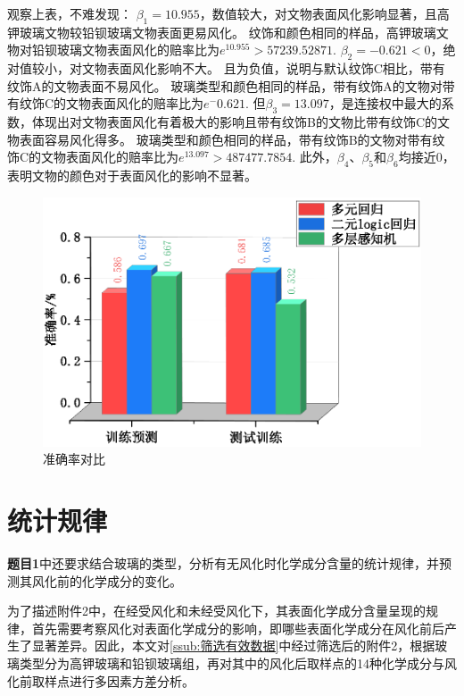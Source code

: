 观察上表，不难发现：
$\beta_1=10.955$，数值较大，对文物表面风化影响显著，且高钾玻璃文物较铅钡玻璃文物表面更易风化。
纹饰和颜色相同的样品，高钾玻璃文物对铅钡玻璃文物表面风化的赔率比为$e^10.955>57239.52871$.
$\beta_2=-0.621<0$，绝对值较小，对文物表面风化影响不大。
且为负值，说明与默认纹饰C相比，带有纹饰A的文物表面不易风化。
玻璃类型和颜色相同的样品，带有纹饰A的文物对带有纹饰C的文物表面风化的赔率比为$e^-0.621$.
但$\beta_3=13.097$，是连接权中最大的系数，体现出对文物表面风化有着极大的影响且带有纹饰B的文物比带有纹饰C的文物表面容易风化得多。
玻璃类型和颜色相同的样品，带有纹饰B的文物对带有纹饰C的文物表面风化的赔率比为$e^13.097>487477.7854$.
此外，$\beta_4$、$\beta_5$和$\beta_6$均接近0，表明文物的颜色对于表面风化的影响不显著。


\begin{figure}[!htp]
	\centering
	\includegraphics[width=12cm]{figure/准确率.eps}
	\caption{准确率对比}
\end{figure}






\section{统计规律} %
\label{sec:统计规律}

\textbf{题目1}中还要求结合玻璃的类型，分析有无风化时化学成分含量的统计规律，并预测其风化前的化学成分的变化。

为了描述附件2中，在经受风化和未经受风化下，其表面化学成分含量呈现的规律，首先需要考察风化对表面化学成分的影响，即哪些表面化学成分在风化前后产生了显著差异。因此，本文对\ref{ssub:筛选有效数据}中经过筛选后的附件2，根据玻璃类型分为高钾玻璃和铅钡玻璃组，再对其中的风化后取样点的14种化学成分与风化前取样点进行多因素方差分析。

